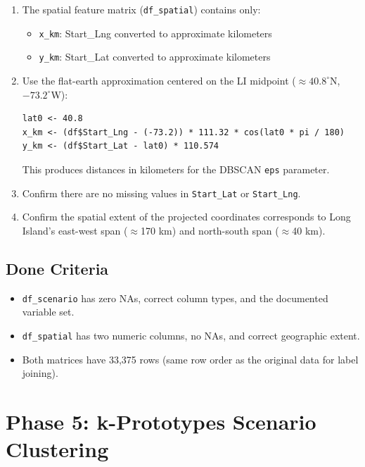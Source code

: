 \documentclass[11pt]{article}
\begin{document}
\begin{enumerate}
  \item The spatial feature matrix (\texttt{df\_spatial}) contains only:
  \begin{itemize}
    \item \texttt{x\_km}: Start\_Lng converted to approximate kilometers
    \item \texttt{y\_km}: Start\_Lat converted to approximate kilometers
  \end{itemize}

  \item Use the flat-earth approximation centered on the LI midpoint ($\approx 40.8^\circ$N, $-73.2^\circ$W):
  \begin{verbatim}
lat0 <- 40.8
x_km <- (df$Start_Lng - (-73.2)) * 111.32 * cos(lat0 * pi / 180)
y_km <- (df$Start_Lat - lat0) * 110.574
  \end{verbatim}
  This produces distances in kilometers for the DBSCAN \texttt{eps} parameter.

  \item Confirm there are no missing values in \texttt{Start\_Lat} or \texttt{Start\_Lng}.

  \item Confirm the spatial extent of the projected coordinates corresponds to Long Island's east-west span ($\approx$170 km) and north-south span ($\approx$40 km).
\end{enumerate}

\subsection{Done Criteria}

\begin{itemize}
  \item \texttt{df\_scenario} has zero NAs, correct column types, and the documented variable set.
  \item \texttt{df\_spatial} has two numeric columns, no NAs, and correct geographic extent.
  \item Both matrices have 33,375 rows (same row order as the original data for label joining).
\end{itemize}

\newpage
\section{Phase 5: k-Prototypes Scenario Clustering}
\end{document}
